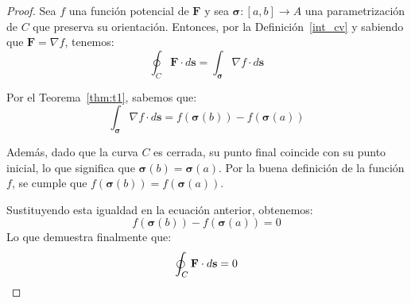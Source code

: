 \begin{proof}
Sea $f$ una función potencial de $\mathbf{F}$ y sea $\boldsymbol{\sigma}: [a,b] \to A$ una parametrización de $C$ que preserva su orientación. Entonces, por la Definición~\ref{int_cv} y sabiendo que $\mathbf{F} = \nabla f$, tenemos: 
\begin{equation*} 
\oint_C \mathbf{F} \cdot d\mathbf{s} = \int_{\boldsymbol{\sigma}} \nabla f \cdot d\mathbf{s} 
\end{equation*} 

Por el Teorema~\ref{thm:t1}, sabemos que: 
\begin{equation*} 
\int_{\boldsymbol{\sigma}} \nabla f \cdot d\mathbf{s} = f(\boldsymbol{\sigma}(b)) - f(\boldsymbol{\sigma}(a)) 
\end{equation*} 

Además, dado que la curva $C$ es cerrada, su punto final coincide con su punto inicial, lo que significa que $\boldsymbol{\sigma}(b) = \boldsymbol{\sigma}(a)$. Por la buena definición de la función $f$, se cumple que $f(\boldsymbol{\sigma}(b)) = f(\boldsymbol{\sigma}(a))$. 

Sustituyendo esta igualdad en la ecuación anterior, obtenemos:
\[ f(\boldsymbol{\sigma}(b)) - f(\boldsymbol{\sigma}(a)) = 0 \]
Lo que demuestra finalmente que: 
\[ \oint_C \mathbf{F} \cdot d\mathbf{s} = 0 \qedhere \] 
\end{proof}








